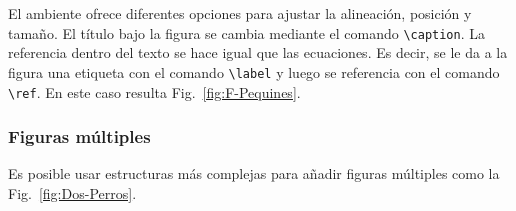 \documentclass[a4paper, titletoc, 12pt]{article}
\begin{document}
El ambiente ofrece diferentes opciones para ajustar la alineación, posición y tamaño. El título bajo la figura se cambia mediante el comando \verb!\caption!. La referencia dentro del texto se hace igual que las ecuaciones. Es decir, se le da a la figura una etiqueta con el comando \verb!\label! y luego se referencia con el comando \verb!\ref!. En este caso resulta Fig.~\ref{fig:F-Pequines}.

\subsubsection*{Figuras múltiples}
Es posible usar estructuras más complejas para añadir figuras múltiples como la Fig.~\ref{fig:Dos-Perros}.

\begin{figure}[h]
    \centering
    \begin{subfigure}[t]{0.3\textwidth}
        \end{subfigure}
    \begin{subfigure}[t]{0.2575\textwidth}
        \centering{%
}
\end{subfigure}
\end{figure}
\end{document}
